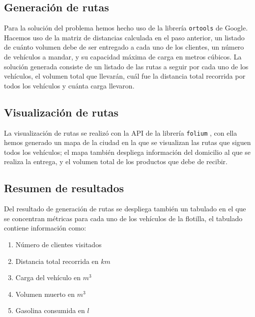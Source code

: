 \documentclass[journal]{IEEEtran}
\begin{document}
        \subsection{Generación de rutas} \label{stage 4}
        
            Para la solución del problema hemos hecho uso de la librería \texttt{ortools} \cite{ortools} de Google. Hacemos uso de la matriz de distancias calculada en el paso anterior, un listado de cuánto volumen debe de ser entregado a cada uno de los clientes, un número de vehículos a mandar, y su capacidad máxima de carga en metros cúbicos. La solución generada consiste de un listado de las rutas a seguir por cada uno de los vehículos, el volumen total que llevarán, cuál fue la distancia total recorrida por todos los vehículos y cuánta carga llevaron.

        \subsection{Visualización de rutas} 
            
            La visualización de rutas se realizó con la API de la librería \texttt{folium} \cite{folium}, con ella hemos generado un mapa de la ciudad en la que se visualizan las rutas que siguen todos los vehículos; el mapa también despliega información del domicilio al que se realiza la entrega, y el volumen total de los productos que debe de recibir.
        
        \subsection{Resumen de resultados}

            Del resultado de generación de rutas se despliega también un tabulado en el que se concentran métricas para cada uno de los vehículos de la flotilla, el tabulado contiene información como:
            \begin{enumerate}
                \item Número de clientes visitados
                \item Distancia total recorrida en $km$
                \item Carga del vehículo en $m^{3}$
                \item Volumen muerto en $m^{3}$
                \item Gasolina consumida en $l$
            \end{enumerate}
\end{document}
